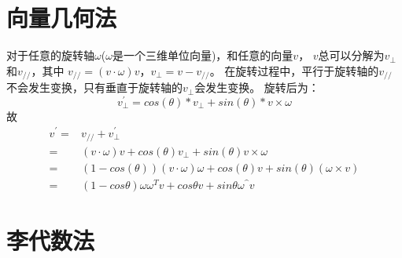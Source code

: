 \documentclass{article}
\begin{document}
\section{向量几何法}
对于任意的旋转轴$\omega$($\omega$是一个三维单位向量)，和任意的向量$v$，
$v$总可以分解为$v_{\perp}$和$v_{//}$，其中
$v_{//}=(v \cdot \omega) v$，$v_{\perp}=v-v_{//}$。
在旋转过程中，平行于旋转轴的$v_{//}$不会发生变换，只有垂直于旋转轴的$v_{\perp}$会发生变换。
旋转后为：
$$v_{\perp}^{'}=cos(\theta)*v_{\perp}+sin(\theta)*v\times \omega$$
故
\begin{equation}
    \begin{split}
        v^{'}=&v_{//}+v_{\perp}^{'}\\
        =&(v \cdot \omega) v+cos(\theta)v_{\perp}+sin(\theta)v\times \omega\\
        =&(1-cos(\theta))(v\cdot\omega)\omega+cos(\theta)v+sin(\theta)(\omega \times v)\\
        =&(1-cos\theta)\omega \omega^T v + cos\theta v + sin\theta \omega^{\^} v
    \end{split}
\end{equation}
\section{李代数法}
\end{document}
